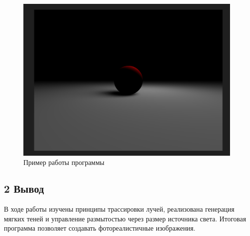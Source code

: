 \documentclass[12pt]{article}
\begin{document}
\begin{figure}[h]

\centering
        
\includegraphics[width=0.8\linewidth]{image.png}
        
\caption{Пример работы программы}
        
\label{fig:mpr}
        
\end{figure}

\subsection*{2 Вывод}
В ходе работы изучены принципы трассировки лучей, реализована генерация мягких теней и управление размытостью через размер источника света. 
Итоговая программа позволяет создавать фотореалистичные изображения.
\end{document}
